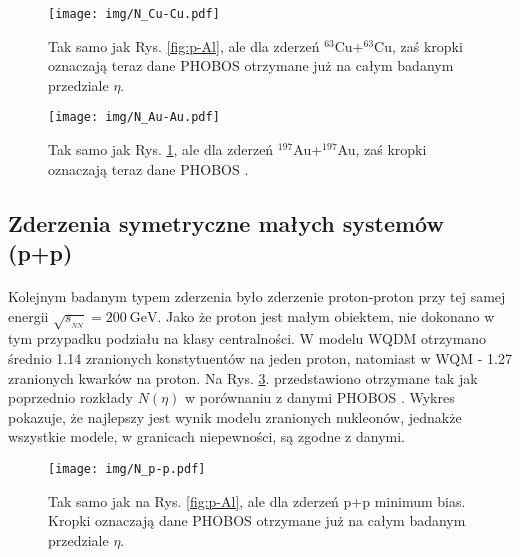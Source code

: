\documentclass[a4paper,12pt]{article}
\begin{document}
\begin{figure}[H]
\begin{center}
\texttt{[image: img/N\_Cu-Cu.pdf]}
\caption{Tak samo jak Rys. \ref{fig:p-Al}, ale dla zderzeń $^{63}$Cu+$^{63}$Cu, zaś kropki oznaczają teraz dane PHOBOS \cite{Alver:2007aa} otrzymane już na całym badanym przedziale $\eta$.}\label{fig:Cu-Cu}
\end{center}
\end{figure}
\vspace{2em}
\begin{figure}[H]
\begin{center}
\texttt{[image: img/N\_Au-Au.pdf]}
\caption{Tak samo jak Rys. \ref{fig:Cu-Cu}, ale dla zderzeń $^{197}$Au+$^{197}$Au, zaś kropki oznaczają teraz dane PHOBOS \cite{Back:2002wb}.}\label{fig:Au-Au}
\end{center}
\end{figure}

\subsection{Zderzenia symetryczne małych systemów (p+p)}
\paragraph{}
Kolejnym badanym typem zderzenia było zderzenie proton-proton przy tej samej energii $\sqrt{s_{_{NN}}} = 200~\text{GeV}$. Jako że proton jest małym obiektem, nie dokonano w tym przypadku podziału na klasy centralności. W modelu WQDM otrzymano średnio 1.14 zranionych konstytuentów na jeden proton, natomiast w WQM - 1.27 zranionych kwarków na proton. Na Rys. \ref{fig:p-p}. przedstawiono otrzymane tak jak poprzednio rozkłady $N(\eta)$ w porównaniu z danymi PHOBOS \cite{Alver:2010ck}. Wykres pokazuje, że najlepszy jest wynik modelu zranionych nukleonów, jednakże wszystkie modele, w granicach niepewności, są zgodne z danymi.

\begin{figure}[H]
\begin{center}
\texttt{[image: img/N\_p-p.pdf]}
\caption{Tak samo jak na Rys. \ref{fig:p-Al}, ale dla zderzeń p+p minimum bias. Kropki oznaczają dane PHOBOS \cite{Alver:2010ck} otrzymane już na całym badanym przedziale $\eta$.}\label{fig:p-p}
\end{center}
\end{figure}
\end{document}
